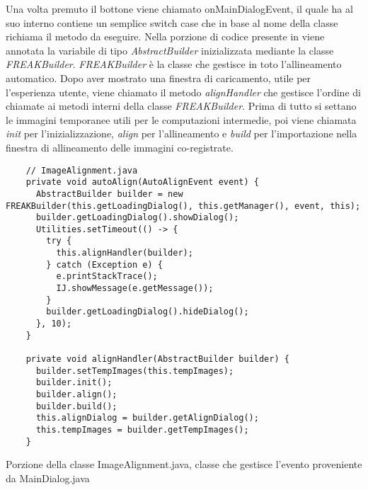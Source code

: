 \noindent Una volta premuto il bottone viene chiamato onMainDialogEvent, il quale ha al suo interno contiene un semplice switch case che in base al nome della classe richiama il metodo da eseguire. Nella porzione di codice presente in  viene annotata la variabile di tipo \textit{AbstractBuilder} inizializzata mediante la classe \textit{FREAKBuilder}. \textit{FREAKBuilder} è la classe che gestisce in toto l'allineamento automatico. Dopo aver mostrato una finestra di caricamento, utile per l'esperienza utente, viene chiamato il metodo \textit{alignHandler} che gestisce l'ordine di chiamate ai metodi interni della classe \textit{FREAKBuilder}. Prima di tutto si settano le immagini temporanee utili per le computazioni intermedie, poi viene chiamata \textit{init} per l'inizializzazione, \textit{align} per l'allineamento e \textit{build} per l'importazione nella finestra di allineamento delle immagini co-registrate. 

\begin{listing}[H]
\begin{verbatim}
    // ImageAlignment.java
    private void autoAlign(AutoAlignEvent event) {
      AbstractBuilder builder = new FREAKBuilder(this.getLoadingDialog(), this.getManager(), event, this);
      builder.getLoadingDialog().showDialog();
      Utilities.setTimeout(() -> {
        try {
          this.alignHandler(builder);
        } catch (Exception e) {
          e.printStackTrace();
          IJ.showMessage(e.getMessage());
        }
        builder.getLoadingDialog().hideDialog();
      }, 10);
    }
    
    private void alignHandler(AbstractBuilder builder) {
      builder.setTempImages(this.tempImages);
      builder.init();
      builder.align();
      builder.build();
      this.alignDialog = builder.getAlignDialog();
      this.tempImages = builder.getTempImages();
    }
\end{verbatim}
\caption{Porzione della classe ImageAlignment.java, classe che gestisce l'evento proveniente da MainDialog.java}\label{lst:autoAlignEvemt}
\end{listing}


